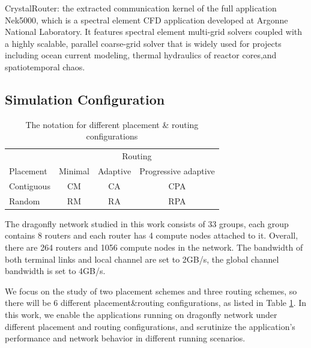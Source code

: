 \documentclass[conference,compsoc]{IEEEtran}
\begin{document}
CrystalRouter: the extracted communication kernel of the full application Nek5000\cite{nek5000}, which is a spectral element CFD application developed at Argonne National Laboratory\cite{crystalrouter}. It features spectral element multi-grid solvers coupled with a highly scalable, parallel coarse-grid solver that is widely used for projects including ocean current modeling, thermal hydraulics of reactor cores,and spatiotemporal chaos. 



\subsection{Simulation Configuration}
\label{sec: simulation configuration}


\begin{table}[ht]
\begin{center}
\caption{The notation for different placement \& routing configurations} 
\label{tab: placement routing configs}
\begin{tabular}{l c c c }
\toprule %
\toprule
&\multicolumn{3}{c}{Routing} \\ %
\cmidrule(l){2-4}
Placement  & Minimal & Adaptive & Progressive adaptive\\ %
\midrule %
Contiguous  &  CM   &   CA   &  CPA   \\ %
\midrule
Random  &   RM  &   RA   &  RPA   \\ 

\midrule %
\bottomrule %
\end{tabular}
\end{center}
\end{table}

The dragonfly network studied in this work consists of 33 groups, each group contains 8 routers and each router has 4 compute nodes attached to it. Overall, there are 264 routers and 1056 compute nodes in the network. The bandwidth of both terminal links and local channel are set to 2GB/s, the global channel bandwidth is set to 4GB/s. 

We focus on the study of two placement schemes and three routing schemes, so there will be 6 different placement\&routing configurations, as listed in Table \ref{tab: placement routing configs}. In this work, we enable the applications running on dragonfly network under different placement and routing configurations, and scrutinize the application's performance and network behavior in different running scenarios. 
\end{document}
